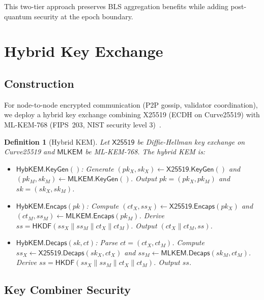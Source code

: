 \documentclass[11pt,a4paper]{article}
\newtheorem{definition}{Definition}[section]
\begin{document}
This two-tier approach preserves BLS aggregation benefits while adding post-quantum
security at the epoch boundary.

\section{Hybrid Key Exchange}
\label{sec:hybrid-kex}

\subsection{Construction}

For node-to-node encrypted communication (P2P gossip, validator coordination), we
deploy a hybrid key exchange combining X25519 (ECDH on Curve25519) with ML-KEM-768
(FIPS~203, NIST security level 3)~\cite{fips203}.

\begin{definition}[Hybrid KEM]
\label{def:hybrid-kem}
Let $\textsf{X25519}$ be Diffie-Hellman key exchange on Curve25519 and $\textsf{MLKEM}$
be ML-KEM-768. The hybrid KEM is:
\begin{itemize}[leftmargin=2em]
  \item $\textsf{HybKEM.KeyGen}()$: Generate $(pk_X, sk_X) \leftarrow \textsf{X25519.KeyGen}()$
        and $(pk_M, sk_M) \leftarrow \textsf{MLKEM.KeyGen}()$.
        Output $pk = (pk_X, pk_M)$ and $sk = (sk_X, sk_M)$.
  \item $\textsf{HybKEM.Encaps}(pk)$: Compute $(ct_X, ss_X) \leftarrow \textsf{X25519.Encaps}(pk_X)$
        and $(ct_M, ss_M) \leftarrow \textsf{MLKEM.Encaps}(pk_M)$.
        Derive $ss = \textsf{HKDF}(ss_X \| ss_M \| ct_X \| ct_M)$.
        Output $(ct_X \| ct_M, ss)$.
  \item $\textsf{HybKEM.Decaps}(sk, ct)$: Parse $ct = (ct_X, ct_M)$.
        Compute $ss_X \leftarrow \textsf{X25519.Decaps}(sk_X, ct_X)$ and
        $ss_M \leftarrow \textsf{MLKEM.Decaps}(sk_M, ct_M)$.
        Derive $ss = \textsf{HKDF}(ss_X \| ss_M \| ct_X \| ct_M)$.
        Output $ss$.
\end{itemize}
\end{definition}

\subsection{Key Combiner Security}
\end{document}

